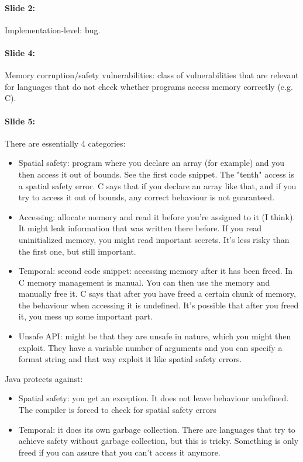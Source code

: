 \documentclass[10pt,a4paper]{report}
\begin{document}
\paragraph{Slide 2:} Implementation-level: bug.

\paragraph{Slide 4:} Memory corruption/safety vulnerabilities: class of vulnerabilities that are relevant for languages that do not check whether programs access memory correctly (e.g. C). 

\paragraph{Slide 5:} There are essentially 4 categories:
\begin{itemize}
\item Spatial safety: program where you declare an array (for example) and you then access it out of bounds. See the first code snippet. The "tenth" access is a spatial safety error. C says that if you declare an array like that, and if you try to access it out of bounds, any correct behaviour is not guaranteed.
\item Accessing: allocate memory and read it before you're assigned to it (I think). It might leak information that was written there before. If you read uninitialized memory, you might read important secrets. It's less risky than the first one, but still important.
\item Temporal: second code snippet: accessing memory after it has been freed. In C memory management is manual. You can then use the memory and manually free it. C says that after you have freed a certain chunk of memory, the behaviour when accessing it is undefined. It's possible that after you freed it, you mess up some important part.
\item Unsafe API: might be that they are unsafe in nature, which you might then exploit. They have a variable number of arguments and you can specify a format string and that way exploit it like spatial safety errors.
\end{itemize}
Java protects against:
\begin{itemize}
\item Spatial safety: you get an exception. It does not leave behaviour undefined. The compiler is forced to check for spatial safety errors
\item Temporal: it does its own garbage collection. There are languages that try to achieve safety without garbage collection, but this is tricky. Something is only freed if you can assure that you can't access it anymore.
\end{itemize}
\end{document}
